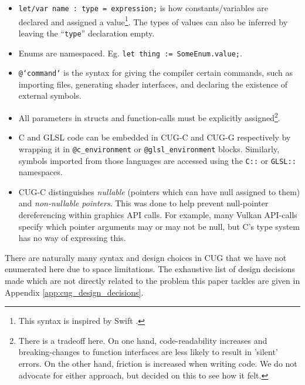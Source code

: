 \documentclass[a4paper,12pt,twoside,openright]{report}
\begin{document}
\begin{itemize}

    \item \texttt{let/var name : type = expression;} is how constants/variables
    are declared and assigned a value\footnote{This syntax is inspired by Swift
    \cite{SwiftSyntax}.}. The types of values can also be inferred by leaving
    the ``\texttt{type}'' declaration empty.

    \item Enums are namespaced. Eg. \texttt{let thing := SomeEnum.value;}.

    \item \texttt{@`command`} is the syntax for giving the compiler certain
    commands, such as importing files, generating shader interfaces, and
    declaring the existence of external symbols.

    \item All parameters in structs and function-calls must be explicitly
    assigned\footnote{There is a tradeoff here. On one hand, code-readability
    increases and breaking-changes to function interfaces are less likely to
    result in 'silent' errors. On the other hand, friction is increased when
    writing code. We do not advocate for either approach, but decided on this
    to see how it felt.}.

    \item C and GLSL code can be embedded in CUG-C and CUG-G respectively by
    wrapping it in \texttt{@c\_environment} or \texttt{@glsl\_environment}
    blocks. Similarly, symbols imported from those languages are accessed using
    the \texttt{C::} or \texttt{GLSL::} namespaces.

    \item CUG-C distinguishes \textit{nullable} (pointers which can have null
    assigned to them) and \textit{non-nullable pointers}. This was done to help
    prevent null-pointer dereferencing within graphics API calls. For example,
    many Vulkan API-calls specify which pointer arguments may or may not be
    null, but C's type system has no way of expressing this.

\end{itemize}

There are naturally many syntax and design choices in CUG that we have not
enumerated here due to space limitations. The exhaustive list of design
decisions made which are not directly related to the problem this paper tackles
are given in Appendix \ref{app:cug_design_decisions}.
\end{document}
